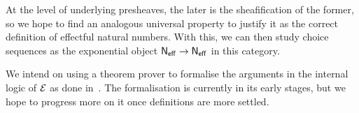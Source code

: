 \documentclass{easychair}
\begin{document}
At the level of underlying presheaves, the later is the sheafification of the
former, so we hope to find an analogous universal property to justify it as the
correct definition of effectful natural numbers.
%
With this, we can then study choice sequences as the exponential object
\({{\mathsf{N}_{\mathsf{eff}}}\to{\mathsf{N}_{\mathsf{eff}}}}\) in this category.

We intend on using a theorem prover to formalise the arguments in the internal
logic of \(\mathcal{E}\) as done in~\cite{sterlingGuardedComputationalType2018}.
%
The formalisation is currently in its early stages, but we hope to progress
more on it once definitions are more settled.





\end{document}
